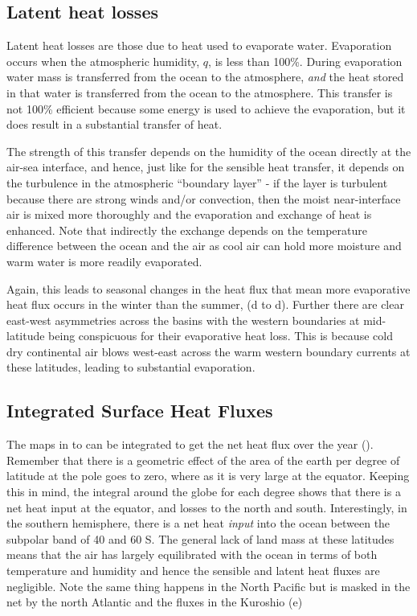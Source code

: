 \subsection{Latent heat losses}

Latent heat losses are those due to heat used to evaporate water.  Evaporation occurs when the atmospheric humidity, $q$, is less than 100\%.  During evaporation water mass is transferred from the ocean to the atmosphere, \emph{and} the heat stored in that water is transferred from the ocean to the atmosphere.   This transfer is not 100\% efficient because some energy is used to achieve the evaporation, but it does result in a substantial transfer of heat.  

The strength of this transfer depends on the humidity of the ocean directly at the air-sea interface, and hence, just like for the sensible heat transfer, it depends on the turbulence in the atmospheric ``boundary layer'' - if the layer is turbulent because there are strong winds and/or convection, then the moist near-interface air is mixed more thoroughly and the evaporation and exchange of heat is enhanced.   Note that indirectly the exchange depends on the temperature difference between the ocean and the air as cool air can hold more moisture and warm water is more readily evaporated.  

Again, this leads to seasonal changes in the heat flux that mean more evaporative heat flux occurs in the winter than the summer, (d to d).  Further there are clear east-west asymmetries across the basins with the western boundaries at mid-latitude being conspicuous for their evaporative heat loss.  This is because cold dry continental air blows west-east across the warm western boundary currents at these latitudes, leading to substantial evaporation.  

\subsection{Integrated Surface Heat Fluxes}

The maps in  to  can be integrated to get the net heat flux over the year ().  Remember that there is a geometric effect of the area of the earth per degree of latitude at the pole goes to zero, where as it is very large at the equator.  Keeping this in mind, the integral around the globe for each degree shows that there is a net heat input at the equator, and losses to the north and south.  Interestingly, in the southern hemisphere, there is a net heat \emph{input} into the ocean between the subpolar band of 40 and 60 S.   The general lack of land mass at these latitudes means that the air has largely equilibrated with the ocean in terms of both temperature and humidity and hence the sensible and latent heat fluxes are negligible.  Note the same thing happens in the North Pacific but is masked in the net by the north Atlantic and the fluxes in the Kuroshio (e)

